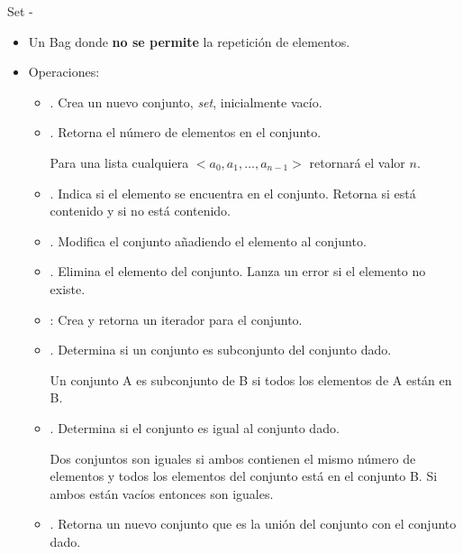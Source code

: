 \documentclass[10pt,envcountsect,spanish]{beamer}
\begin{document}
\begin{frame}[allowframebreaks]{Set -}


\begin{itemize}%
\item Un Bag  donde \textbf{no se permite} la repetición de elementos. 

\item Operaciones:
\begin{itemize}
\item {}. Crea un nuevo conjunto, \textit{set}, inicialmente vacío.

\item {}. Retorna el número de elementos en el conjunto.

Para una lista cualquiera $<a_0, a_1, \ldots, a_{n-1}>$ retornará el valor $n$.

\item {}. Indica si el elemento  se encuentra en el conjunto. Retorna  si está contenido y  si no está contenido.

\item {}. Modifica el conjunto añadiendo  el elemento  al conjunto.

\item {}. Elimina el elemento  del conjunto. Lanza un error si el elemento no existe.


\item {}: Crea y retorna un iterador para el conjunto.


\item {}. Determina si un conjunto es subconjunto del conjunto dado. 

Un conjunto A es subconjunto de B si todos los elementos de A están en B.

\item {}. Determina si el conjunto es igual al conjunto dado. 

Dos conjuntos son iguales si ambos contienen el mismo número de elementos y todos los elementos del conjunto está en el conjunto B. Si ambos están vacíos entonces son iguales.


\item {}. Retorna un nuevo conjunto que es la unión del conjunto con el conjunto dado.


\end{itemize}
\end{itemize}
\end{frame}
\end{document}
